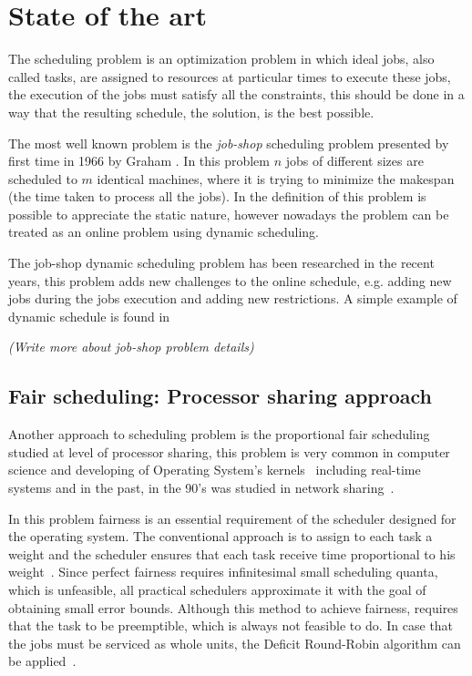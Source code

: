 \chapter{State of the art}

The scheduling problem is an optimization problem in which ideal jobs, also called tasks, are assigned to resources at particular times to execute these jobs, the execution of the jobs must satisfy all the constraints, this should be done in a way that the resulting schedule, the solution, is the best possible.

The most well known problem is the \textit{job-shop} scheduling problem presented by first time in 1966 by Graham \cite{graham66}. In this problem $n$ jobs of different sizes are scheduled to $m$ identical machines, where it is trying to minimize the makespan (the time taken to process all the jobs). In the definition of this problem is possible to appreciate the static nature, however     nowadays the problem can be treated as an online problem using dynamic scheduling.

The job-shop dynamic scheduling problem has been researched in the recent years, this problem adds new challenges to the online schedule, e.g. adding new jobs during the jobs execution and adding new restrictions. A simple example of dynamic schedule is found in 

\textit{(Write more about job-shop problem details)}

\section{Fair scheduling: Processor sharing approach}

Another approach to scheduling problem is the proportional fair scheduling studied at level of processor sharing, this problem is very common in computer science and developing of Operating System's kernels~\cite{li09} including real-time systems and in the past, in the 90's was studied in network sharing~\cite{parekh93}. 

In this problem fairness is an essential requirement of the scheduler designed for the operating system. The conventional approach is to assign to each task a weight and the scheduler ensures that each task receive time proportional to his weight~\cite{katevenis91, parekh93}. Since perfect fairness requires infinitesimal small scheduling quanta, which is unfeasible, all practical schedulers approximate it with the goal of obtaining small error bounds. Although this method to achieve fairness, requires that the task to be preemptible, which is always not feasible to do. In case that the jobs must be serviced as whole units, the Deficit Round-Robin algorithm can be applied~\cite{shreedhar96}. 

